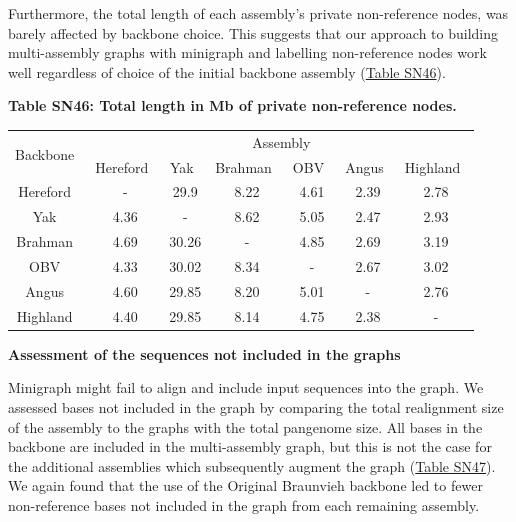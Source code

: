 \documentclass[../main.tex]{subfiles}
\begin{document}
\begin{flushleft}
\bigskip
\normalsize

Furthermore, the total length of each assembly’s private non-reference nodes, was barely affected by backbone choice. This suggests that our approach to building multi-assembly graphs with minigraph and labelling non-reference nodes work well regardless of choice of the initial backbone assembly (\hyperlink{Table SN46}{Table SN46}).

\bigskip

\textbf{\hypertarget{Table SN46}{Table SN46}: Total length in Mb of private non-reference nodes.}
\begin{center}
    \begin{tabular}{|c|c|c|c|c|c|c|}
    \hline
    \multirow{2}{*}{Backbone~} & \multicolumn{6}{c|}{Assembly}                             \\
    \cline{2-7}
                               & Hereford~ & Yak~  & Brahman~ & OBV~ & Angus~ & Highland~  \\
    \hline
    Hereford~                  & -         & 29.9  & 8.22     & 4.61 & 2.39   & 2.78       \\
    \hline
    Yak~                       & 4.36      & -     & 8.62     & 5.05 & 2.47   & 2.93       \\
    \hline
    Brahman~                   & 4.69      & 30.26 & -        & 4.85 & 2.69   & 3.19       \\
    \hline
    OBV~                       & 4.33      & 30.02 & 8.34     & -    & 2.67   & 3.02       \\
    \hline
    Angus~                     & 4.60      & 29.85 & 8.20     & 5.01 & -      & 2.76       \\
    \hline
    Highland~                  & 4.40      & 29.85 & 8.14     & 4.75 & 2.38   & -          \\
    \hline
    \end{tabular}
\end{center}
\newpage

\textbf{Assessment of the sequences not included in the graphs}

Minigraph might fail to align and include input sequences into the graph. We assessed bases not included in the graph by comparing the total realignment size of the assembly to the graphs with the total pangenome size. All bases in the backbone are included in the multi-assembly graph, but this is not the case for the additional assemblies which subsequently augment the graph (\hyperlink{Table SN47}{Table SN47}). We again found that the use of the Original Braunvieh backbone led to fewer non-reference bases not included in the graph from each remaining assembly.


\end{flushleft}
\end{document}
